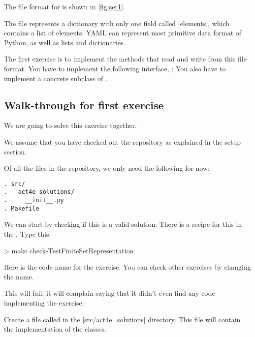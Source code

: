 The file format for  is shown in \cref{fig:set1}.


The file represents a dictionary with only one field called \pystr|elements|, which contains a list of elements.
YAML can represent most primitive data format of Python, as well as lists and dictionaries.

\begin{exercise}
  \label{ex:setrepr}
  The first exercise is to implement the methods that read and write from this file format.
  You have to implement the following interface, :
%
  You also have to implement a concrete subclass of .
\end{exercise}

\subsection{Walk-through for first exercise}

We are going to solve this exercise together.

We assume that you have checked out the repository as explained in the setup section.

Of all the files in the repository, we only need the following for now:

\begin{verbatim}
. src/
.   act4e_solutions/
.     __init__.py
. Makefile
\end{verbatim}


We can start by checking if this is a valid solution. There is a recipe for this in the .
Type this:

\begin{console}
  > make check-TestFiniteSetRepresentation
\end{console}

Here  is the code name for the exercise. You can check other exercises by changing the name.

This will fail; it will complain saying that it didn't even find any code implementing the exercise.


Create a file called  in the \files|src/act4e_solutions| directory.
This file will contain the implementation of the classes.

